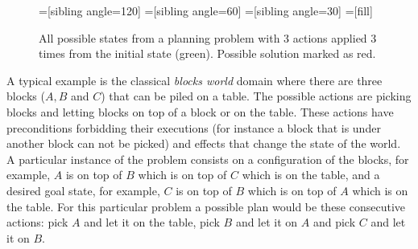 \documentclass{report}
\theoremstyle{plain}
\begin{document}
\begin{figure}[h]
\label{fig:tree}
\centering
{}=[sibling angle=120]
=[sibling angle=60]
=[sibling angle=30]
=[fill]
\caption{All possible states from a planning problem with 3 actions applied 3 times from the initial state (green). Possible solution marked as red.}
\end{figure}

A typical example is the classical \emph{blocks world} domain where there are three blocks ($A,B$ and $C$) that can be piled   on a table. The possible actions are picking blocks and letting blocks on top of a block or on the table. These actions have preconditions forbidding their executions (for instance a block that is under another block can not be picked) and effects that change the state of the world. A particular instance of the problem consists on a configuration of the blocks, for example, $A$ is on top of $B$ which is on top of $C$ which is on the table, and a desired goal state, for example, $C$ is on top of $B$ which is on top of $A$ which is on the table. For this particular problem a possible plan would be these consecutive actions: pick $A$ and let it on the table, pick $B$ and let it on $A$ and pick $C$ and let it on $B$.
\end{document}
